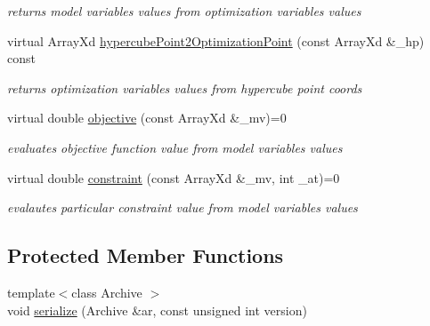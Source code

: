 \begin{DoxyCompactItemize}
\begin{DoxyCompactList}\small\item\em returns model variables values from optimization variables values \end{DoxyCompactList}\item 
virtual Array\-Xd \hyperlink{class_go_s_u_m_1_1_c_optimization_problem_afb9c89eebedd7edc96cbfa97adbfe422}{hypercube\-Point2\-Optimization\-Point} (const Array\-Xd \&\-\_\-hp) const 
\begin{DoxyCompactList}\small\item\em returns optimization variables values from hypercube point coords \end{DoxyCompactList}\item 
virtual double \hyperlink{class_go_s_u_m_1_1_c_optimization_problem_a41c6d21ac069dff96410dc521359a1f6}{objective} (const Array\-Xd \&\-\_\-mv)=0
\begin{DoxyCompactList}\small\item\em evaluates objective function value from model variables values \end{DoxyCompactList}\item 
virtual double \hyperlink{class_go_s_u_m_1_1_c_optimization_problem_a6ac2de163800c0cfcbba0c45036c82cf}{constraint} (const Array\-Xd \&\-\_\-mv, int \-\_\-at)=0
\begin{DoxyCompactList}\small\item\em evalautes particular constraint value from model variables values \end{DoxyCompactList}\end{DoxyCompactItemize}
\subsection*{Protected Member Functions}
\begin{DoxyCompactItemize}
\item 
{\footnotesize template$<$class Archive $>$ }\\void \hyperlink{class_go_s_u_m_1_1_c_optimization_problem_a61cc3a27bbcaa8ecc2e6421a2047b169}{serialize} (Archive \&ar, const unsigned int version)
\end{DoxyCompactItemize}
